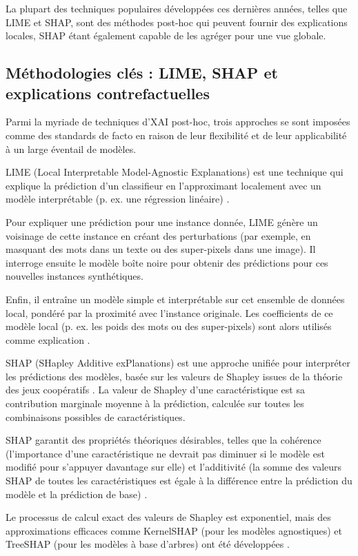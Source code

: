 La plupart des techniques populaires développées ces dernières années, telles que LIME et SHAP, sont des méthodes post-hoc qui peuvent fournir des explications locales, SHAP étant également capable de les agréger pour une vue globale.
\subsection{Méthodologies clés : LIME, SHAP et explications contrefactuelles}
Parmi la myriade de techniques d'XAI post-hoc, trois approches se sont imposées comme des standards de facto en raison de leur flexibilité et de leur applicabilité à un large éventail de modèles.

LIME (Local Interpretable Model-Agnostic Explanations) est une technique qui explique la prédiction d'un classifieur en l'approximant localement avec un modèle interprétable (p. ex. une régression linéaire) \citet{Ribeiro2016Why}.

Pour expliquer une prédiction pour une instance donnée, LIME génère un voisinage de cette instance en créant des perturbations (par exemple, en masquant des mots dans un texte ou des super-pixels dans une image). Il interroge ensuite le modèle boîte noire pour obtenir des prédictions pour ces nouvelles instances synthétiques.

Enfin, il entraîne un modèle simple et interprétable sur cet ensemble de données local, pondéré par la proximité avec l'instance originale. Les coefficients de ce modèle local (p. ex. les poids des mots ou des super-pixels) sont alors utilisés comme explication \citep{Ribeiro2016Why, Siganos2019Explaining}.

SHAP (SHapley Additive exPlanations) est une approche unifiée pour interpréter les prédictions des modèles, basée sur les valeurs de Shapley issues de la théorie des jeux coopératifs \citet{Lundberg2023A}. La valeur de Shapley d'une caractéristique est sa contribution marginale moyenne à la prédiction, calculée sur toutes les combinaisons possibles de caractéristiques.

SHAP garantit des propriétés théoriques désirables, telles que la cohérence (l'importance d'une caractéristique ne devrait pas diminuer si le modèle est modifié pour s'appuyer davantage sur elle) et l'additivité (la somme des valeurs SHAP de toutes les caractéristiques est égale à la différence entre la prédiction du modèle et la prédiction de base) \citep{Lundberg2023A, Siganos2019Explaining}.

Le processus de calcul exact des valeurs de Shapley est exponentiel, mais des approximations efficaces comme KernelSHAP (pour les modèles agnostiques) et TreeSHAP (pour les modèles à base d'arbres) ont été développées \citet{Lundberg2023A}. 

